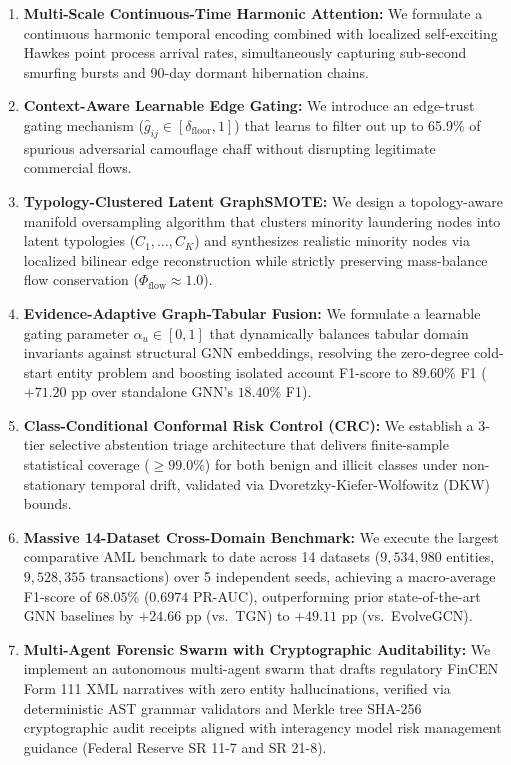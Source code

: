 \begin{enumerate}
    \item \textbf{Multi-Scale Continuous-Time Harmonic Attention:} We formulate a continuous harmonic temporal encoding combined with localized self-exciting Hawkes point process arrival rates, simultaneously capturing sub-second smurfing bursts and 90-day dormant hibernation chains.
    \item \textbf{Context-Aware Learnable Edge Gating:} We introduce an edge-trust gating mechanism ($\hat{g}_{ij} \in [\delta_{\text{floor}}, 1]$) that learns to filter out up to 65.9\% of spurious adversarial camouflage chaff without disrupting legitimate commercial flows.
    \item \textbf{Typology-Clustered Latent GraphSMOTE:} We design a topology-aware manifold oversampling algorithm that clusters minority laundering nodes into latent typologies ($C_1, \dots, C_K$) and synthesizes realistic minority nodes via localized bilinear edge reconstruction while strictly preserving mass-balance flow conservation ($\Phi_{\text{flow}} \approx 1.0$).
    \item \textbf{Evidence-Adaptive Graph-Tabular Fusion:} We formulate a learnable gating parameter $\alpha_u \in [0, 1]$ that dynamically balances tabular domain invariants against structural GNN embeddings, resolving the zero-degree cold-start entity problem and boosting isolated account F1-score to $89.60\%$ F1 ($+71.20\text{ pp}$ over standalone GNN's $18.40\%$ F1).
    \item \textbf{Class-Conditional Conformal Risk Control (CRC):} We establish a 3-tier selective abstention triage architecture that delivers finite-sample statistical coverage ($\ge 99.0\%$) for both benign and illicit classes under non-stationary temporal drift, validated via Dvoretzky-Kiefer-Wolfowitz (DKW) bounds.
    \item \textbf{Massive 14-Dataset Cross-Domain Benchmark:} We execute the largest comparative AML benchmark to date across 14 datasets ($9,534,980$ entities, $9,528,355$ transactions) over 5 independent seeds, achieving a macro-average F1-score of $68.05\%$ ($0.6974$ PR-AUC), outperforming prior state-of-the-art GNN baselines by $+24.66\text{ pp}$ (vs.\ TGN) to $+49.11\text{ pp}$ (vs.\ EvolveGCN).
    \item \textbf{Multi-Agent Forensic Swarm with Cryptographic Auditability:} We implement an autonomous multi-agent swarm that drafts regulatory FinCEN Form 111 XML narratives with zero entity hallucinations, verified via deterministic AST grammar validators and Merkle tree SHA-256 cryptographic audit receipts aligned with interagency model risk management guidance (Federal Reserve SR 11-7 and SR 21-8).
\end{enumerate}

